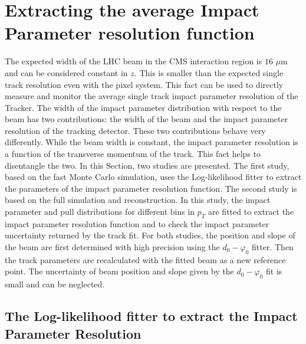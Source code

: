 \documentclass{cmspaper}
\begin{document}
\section{\label{sec:ipextract}Extracting the average Impact Parameter resolution function}
The expected width of the LHC beam in the CMS interaction region is  $16$ $\mu$m and can be considered constant in $z$. 
This is smaller than the expected single track resolution even with the pixel system. 
This fact can be used to directly measure and monitor the average single track impact parameter resolution of the 
Tracker. The width of the impact parameter distribution with respect to the beam has two contributions:
the width of the beam and the  impact parameter resolution of the tracking detector. These two contributions behave very 
differently. While the beam width is constant, the impact parameter resolution is a function of the transverse momentum 
of the track. This fact helps to disentangle the two. 
In this Section, two studies are presented.  The first study, based on the fast Monte Carlo simulation, uses the 
Log-likelihood fitter to extract the parameters of the impact parameter resolution function. 
The second study is based on the full simulation and  reconstruction.
In this study, the  impact parameter and pull distributions for different bins in $p_T$ are fitted to extract the impact 
parameter resolution function and to check the impact parameter uncertainty returned by the track fit. 
For both studies, the position and slope of the beam are first determined with high precision using the  
$d_0-\varphi_0$ fitter. Then the track parameters are recalculated with the fitted beam 
as a new reference point. The uncertainty of beam position and slope given by the $d_0-\varphi_0$ fit is small and 
can be neglected.  

 
\subsection{\label{sec:ipresol}The Log-likelihood {fitter} to extract the Impact Parameter Resolution}
\end{document}
